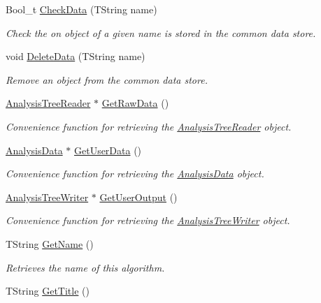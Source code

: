 \begin{DoxyCompactItemize}
Bool\+\_\+t \hyperlink{class_h_a_l_1_1_algorithm_a6609ea9ac6dbc42adb5b110a41201c9a}{Check\+Data} (T\+String name)
\begin{DoxyCompactList}\small\item\em Check the on object of a given name is stored in the common data store. \end{DoxyCompactList}\item 
void \hyperlink{class_h_a_l_1_1_algorithm_af0211270f880699c5a260754bbaa9640}{Delete\+Data} (T\+String name)
\begin{DoxyCompactList}\small\item\em Remove an object from the common data store. \end{DoxyCompactList}\item 
\hyperlink{class_h_a_l_1_1_analysis_tree_reader}{Analysis\+Tree\+Reader} $\ast$ \hyperlink{class_h_a_l_1_1_algorithm_ae80d02cd08ddc48a82f217af77ffde20}{Get\+Raw\+Data} ()
\begin{DoxyCompactList}\small\item\em Convenience function for retrieving the \hyperlink{class_h_a_l_1_1_analysis_tree_reader}{Analysis\+Tree\+Reader} object. \end{DoxyCompactList}\item 
\hyperlink{class_h_a_l_1_1_analysis_data}{Analysis\+Data} $\ast$ \hyperlink{class_h_a_l_1_1_algorithm_ae9b7d3532acfaed9b502bd462bd22c94}{Get\+User\+Data} ()
\begin{DoxyCompactList}\small\item\em Convenience function for retrieving the \hyperlink{class_h_a_l_1_1_analysis_data}{Analysis\+Data} object. \end{DoxyCompactList}\item 
\hyperlink{class_h_a_l_1_1_analysis_tree_writer}{Analysis\+Tree\+Writer} $\ast$ \hyperlink{class_h_a_l_1_1_algorithm_af6233cfbe13ce76207a98b12d4da6f16}{Get\+User\+Output} ()
\begin{DoxyCompactList}\small\item\em Convenience function for retrieving the \hyperlink{class_h_a_l_1_1_analysis_tree_writer}{Analysis\+Tree\+Writer} object. \end{DoxyCompactList}\item 
\hypertarget{class_h_a_l_1_1_algorithm_a0a3b6fa6eb3cf0063187c2b442f64ae8}{T\+String \hyperlink{class_h_a_l_1_1_algorithm_a0a3b6fa6eb3cf0063187c2b442f64ae8}{Get\+Name} ()}\label{class_h_a_l_1_1_algorithm_a0a3b6fa6eb3cf0063187c2b442f64ae8}

\begin{DoxyCompactList}\small\item\em Retrieves the name of this algorithm. \end{DoxyCompactList}\item 
\hypertarget{class_h_a_l_1_1_algorithm_a9245bfda990ffdbde86cc56bcacd5b72}{T\+String \hyperlink{class_h_a_l_1_1_algorithm_a9245bfda990ffdbde86cc56bcacd5b72}{Get\+Title} ()}\label{class_h_a_l_1_1_algorithm_a9245bfda990ffdbde86cc56bcacd5b72}


\end{DoxyCompactItemize}

